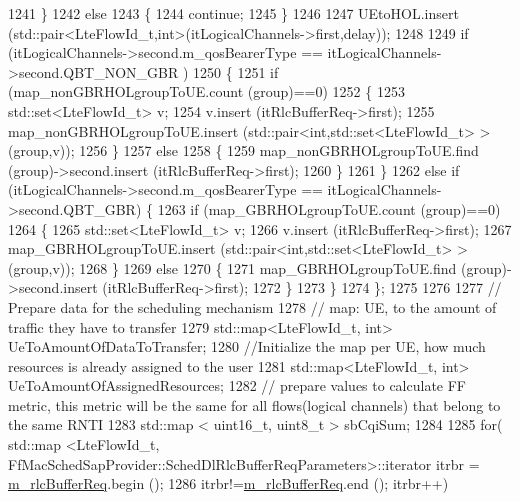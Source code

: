 \begin{DoxyCode}
1241         \}
1242       \textcolor{keywordflow}{else}
1243         \{
1244           \textcolor{keywordflow}{continue};
1245         \}
1246 
1247       UEtoHOL.insert (std::pair<LteFlowId\_t,int>(itLogicalChannels->first,delay));
1248 
1249       \textcolor{keywordflow}{if} (itLogicalChannels->second.m\_qosBearerType == itLogicalChannels->second.QBT\_NON\_GBR )
1250         \{
1251           \textcolor{keywordflow}{if} (map\_nonGBRHOLgroupToUE.count (group)==0)
1252             \{
1253               std::set<LteFlowId\_t> v;
1254               v.insert (itRlcBufferReq->first);
1255               map\_nonGBRHOLgroupToUE.insert (std::pair<\textcolor{keywordtype}{int},std::set<LteFlowId\_t> >(group,v));
1256             \}
1257           \textcolor{keywordflow}{else}
1258             \{
1259               map\_nonGBRHOLgroupToUE.find (group)->second.insert (itRlcBufferReq->first);
1260             \}
1261         \}
1262       \textcolor{keywordflow}{else} \textcolor{keywordflow}{if} (itLogicalChannels->second.m\_qosBearerType == itLogicalChannels->second.QBT\_GBR) \{
1263           \textcolor{keywordflow}{if} (map\_GBRHOLgroupToUE.count (group)==0)
1264             \{
1265               std::set<LteFlowId\_t> v;
1266               v.insert (itRlcBufferReq->first);
1267               map\_GBRHOLgroupToUE.insert (std::pair<\textcolor{keywordtype}{int},std::set<LteFlowId\_t> >(group,v));
1268             \}
1269           \textcolor{keywordflow}{else}
1270             \{
1271               map\_GBRHOLgroupToUE.find (group)->second.insert (itRlcBufferReq->first);
1272             \}
1273         \}
1274     \};
1275 
1276 
1277   \textcolor{comment}{// Prepare data for the scheduling mechanism}
1278   \textcolor{comment}{// map: UE, to the amount of traffic they have to transfer}
1279   std::map<LteFlowId\_t, int> UeToAmountOfDataToTransfer;
1280   \textcolor{comment}{//Initialize the map per UE, how much resources is already assigned to the user}
1281   std::map<LteFlowId\_t, int> UeToAmountOfAssignedResources;
1282   \textcolor{comment}{// prepare values to calculate FF metric, this metric will be the same for all flows(logical channels)
       that belong to the same RNTI}
1283   std::map < uint16\_t, uint8\_t > sbCqiSum;
1284 
1285   \textcolor{keywordflow}{for}( std::map <LteFlowId\_t, FfMacSchedSapProvider::SchedDlRlcBufferReqParameters>::iterator itrbr = 
      \hyperlink{classns3_1_1CqaFfMacScheduler_ae9f6c7fc32e6dd08573470c70d827610}{m\_rlcBufferReq}.begin ();
1286        itrbr!=\hyperlink{classns3_1_1CqaFfMacScheduler_ae9f6c7fc32e6dd08573470c70d827610}{m\_rlcBufferReq}.end (); itrbr++)

\end{DoxyCode}
